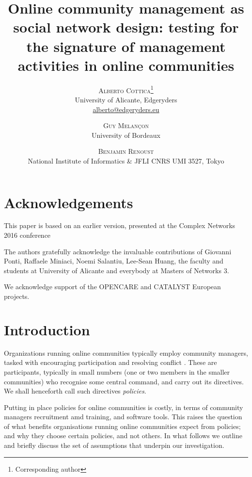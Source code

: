 \documentclass{article}
\title{Online community management as social network design: testing for the signature of management activities in online communities} %
\author{\textsc{Alberto Cottica}\thanks{Corresponding author} \\[1ex] \normalsize University of Alicante, Edgeryders \\ \normalsize \href{mailto:alberto@edgeryders.eu}{alberto@edgeryders.eu}\\
\and \textsc{Guy Melançon}\\
[1ex] \normalsize University of Bordeaux \\ 
\and \textsc{Benjamin Renoust} \\[1ex] 
\normalsize National Institute of Informatics \& JFLI CNRS UMI 3527, Tokyo \\ 
}
\date{} %
\begin{document}
\maketitle


\section*{Acknowledgements}
\noindent This paper is based on an earlier version, presented at the Complex Networks 2016 conference \cite{cottica2016testing}

\noindent The authors gratefully acknowledge the invaluable contributions of Giovanni Ponti, Raffaele Miniaci, Noemi Salantiu, Lee-Sean Huang, the faculty and students at University of Alicante and everybody at Masters of Networks 3.

\noindent We acknowledge support of the OPENCARE and CATALYST European projects.

\section{Introduction}

Organizations running online communities typically employ community managers, tasked with encouraging participation and resolving conflict \cite{rheingold1993virtual}. 
These are participants, typically in small numbers (one or two members in the smaller communities) who recognise some central command, and carry out its directives. We shall henceforth call such directives \emph{policies}. 

Putting in place policies for online communities is costly, in terms of community managers recruitment amd training, and software tools. This raises the question of what benefits organisations running online communities expect from policies; and why they choose certain policies, and not others. In what follows we outline and briefly discuss the set of assumptions that underpin our investigation.
\end{document}
